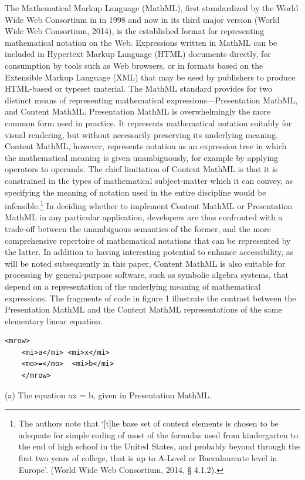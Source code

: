 \documentclass[11.5pt]{sig-alternate} %
\begin{document}
\begin{large}
The Mathematical Markup Language (MathML), first standardized by the World Wide Web Consortium in in 1998 and now in its third major version (World Wide Web Consortium, 2014), is the established format for representing mathematical notation on the Web. Expressions written in MathML can be included in Hypertext Markup Language (HTML) documents directly, for consumption by tools such as Web browsers, or in formats based on the Extensible Markup Language (XML) that may be used by publishers to produce HTML-based or typeset material. The MathML standard provides for two distinct means of representing mathematical expressions—Presentation MathML, and Content MathML. Presentation MathML is overwhelmingly the more common form used in practice. It represents mathematical notation suitably for visual rendering, but without necessarily preserving its underlying meaning. Content MathML, however, represents notation as an expression tree in which the mathematical meaning is given unambiguously, for example by applying operators to operands. The chief limitation of Content MathML is that it is constrained in the types of mathematical subject-matter which it can convey, as specifying the meaning of notation used in the entire discipline would be infeasible.\footnote{The authors note that ‘[t]he base set of content elements is chosen to be adequate for simple coding of most of the formulas used from kindergarten to the end of high school in the United States, and probably beyond through the first two years of college, that is up to A-Level or Baccalaureate level in Europe’. (World Wide Web Consortium, 2014, § 4.1.2).} In deciding whether to implement Content MathML or Presentation MathML in any particular application, developers are thus confronted with a trade-off between the unambiguous semantics of the former, and the more comprehensive repertoire of mathematical notations that can be represented by the latter. In addition to having interesting potential to enhance accessibility, as will be noted subsequently in this paper, Content MathML is also suitable for processing by general-purpose software, such as symbolic algebra systems, that depend on a representation of the underlying meaning of mathematical expressions. The fragments of code in figure 1 illustrate the contrast between the Presentation MathML and the Content MathML representations of the same elementary linear equation.

\begin{verbatim}
<mrow>
    <mi>a</mi> <mi>x</mi>
    <mo>=</mo>  <mi>b</mi>
    </mrow>
\end{verbatim}
\begin{normalsize}
(a)	The equation ax = b, given in Presentation MathML.
\end{normalsize}


\end{large}
\end{document}
